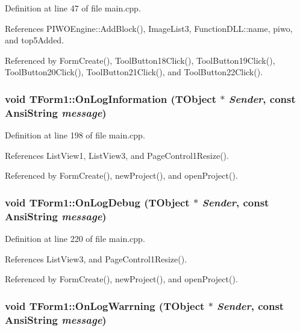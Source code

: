 Definition at line 47 of file main.cpp.

References PIWOEngine::AddBlock(), ImageList3, FunctionDLL::name, piwo, and top5Added.

Referenced by FormCreate(), ToolButton18Click(), ToolButton19Click(), ToolButton20Click(), ToolButton21Click(), and ToolButton22Click().\hypertarget{classTForm1_75b6c8accb0441ab6aaa5c6cc834bea0}{
\subsubsection[OnLogInformation]{\setlength{\rightskip}{0pt plus 5cm}void TForm1::OnLogInformation (TObject $\ast$ {\em Sender}, \/  const AnsiString {\em message})}}
\label{classTForm1_75b6c8accb0441ab6aaa5c6cc834bea0}




Definition at line 198 of file main.cpp.

References ListView1, ListView3, and PageControl1Resize().

Referenced by FormCreate(), newProject(), and openProject().\hypertarget{classTForm1_9673ad61a576d47d7ad53cb13a3e5a4d}{
\subsubsection[OnLogDebug]{\setlength{\rightskip}{0pt plus 5cm}void TForm1::OnLogDebug (TObject $\ast$ {\em Sender}, \/  const AnsiString {\em message})}}
\label{classTForm1_9673ad61a576d47d7ad53cb13a3e5a4d}




Definition at line 220 of file main.cpp.

References ListView3, and PageControl1Resize().

Referenced by FormCreate(), newProject(), and openProject().\hypertarget{classTForm1_dfbe2953cac1319d0754474438b2d2b6}{
\subsubsection[OnLogWarrning]{\setlength{\rightskip}{0pt plus 5cm}void TForm1::OnLogWarrning (TObject $\ast$ {\em Sender}, \/  const AnsiString {\em message})}}
\label{classTForm1_dfbe2953cac1319d0754474438b2d2b6}




